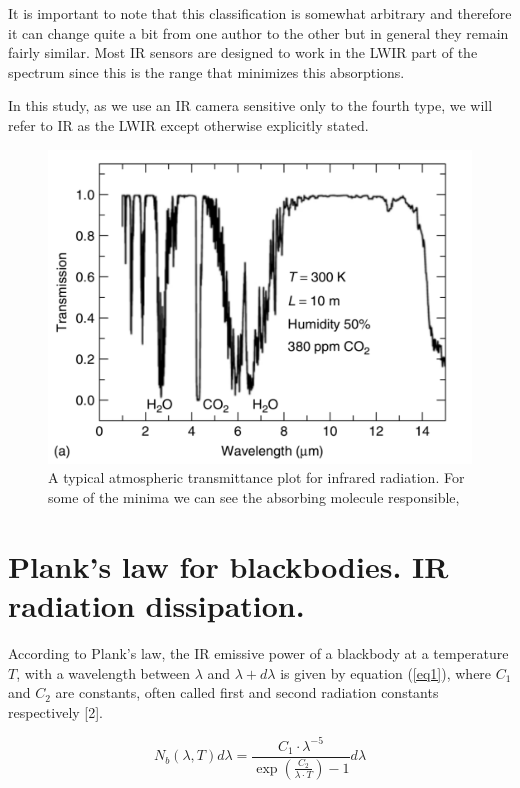 		It is important to note that this classification is somewhat arbitrary and therefore it can change quite a bit from one author to the other but in general they remain fairly similar. Most IR sensors are designed to work in the LWIR part of the spectrum since this is the range that minimizes this absorptions.
		
		In this study, as we use an IR camera sensitive only to the fourth type, we will refer to IR as the LWIR except otherwise explicitly stated.
		
		\begin{figure}[ht!]
			\centering
			\captionsetup{justification=centering,margin=2cm}
			\includegraphics[scale=0.45]{Figures/Chapter01/Transmission.pdf}
			\caption{\label{fig2} A typical atmospheric transmittance plot  for infrared radiation. For some of the minima we can see the absorbing molecule responsible,}
		\end{figure}
		
	\section{Plank's law for blackbodies. IR radiation dissipation.}
	
		According to Plank's law, the IR emissive power of a blackbody at a temperature $T$, with a wavelength between $\lambda$ and $\lambda+d\lambda$ is given by equation (\ref{eq1}), where $C_{1}$ and $C_{2}$ are constants, often called first and second radiation constants respectively [2].
		
		\begin{equation}
			\label{eq1}
			N_{b}(\lambda,T)d\lambda=\frac{C_{1} \cdot \lambda^{-5}}{\exp (\frac{C_{2}}{\lambda\cdot T}) -1} d\lambda
		\end{equation}
		
